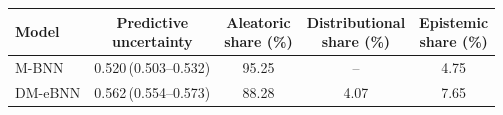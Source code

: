 \begin{tabular}{lcccc}
\toprule
Model & \shortstack{Predictive\\uncertainty} & \shortstack{Aleatoric\\share (\%)} & \shortstack{Distributional\\share (\%)} & \shortstack{Epistemic\\share (\%)} \\
\midrule
M-BNN & 0.520\,(0.503--0.532) & 95.25 & -- & 4.75 \\
DM-eBNN & 0.562\,(0.554--0.573) & 88.28 & 4.07 & 7.65 \\
\bottomrule
\end{tabular}
